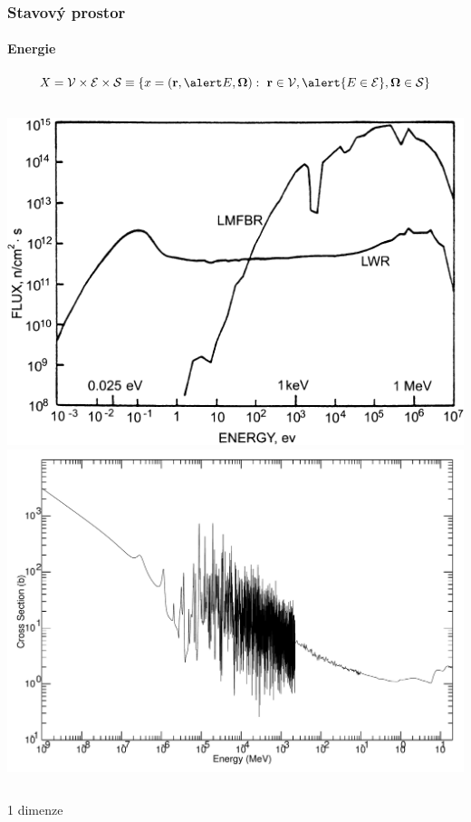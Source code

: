 \begin{frame}[t]
  \frametitle{Stavový prostor}
  \framesubtitle{Energie}
 
  $$
    X = \VV \times \EE \times \SS \equiv \{x = (\br,\alert E,\bomega):\ \br\in \VV, \alert{E \in \EE}, \bomega\in \SS\}
  $$
  \vspace{.5em}
  \begin{columns}
  \centering\includegraphics[width=.9\textwidth]{obr/spektrum}
  \centering\includegraphics[width=.9\textwidth]{obr/U235f}
  \end{columns}
  \begin{center}
  \alert{1 dimenze}
  \end{center}
\end{frame}

